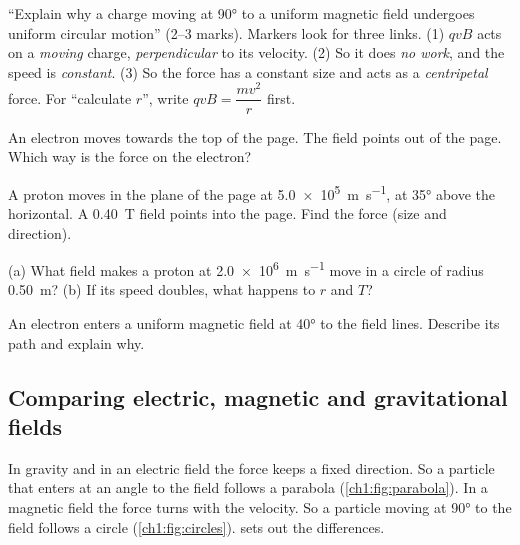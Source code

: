 \begin{examtip}
``Explain why a charge moving at \ang{90} to a uniform magnetic field undergoes
uniform circular motion'' (2--3 marks). Markers look for three links.
(1) $qvB$ acts on a \emph{moving} charge, \emph{perpendicular} to its velocity.
(2) So it does \emph{no work}, and the speed is \emph{constant}. (3) So the
force has a constant size and acts as a \emph{centripetal} force. For
``calculate $r$'', write $qvB = \dfrac{mv^2}{r}$ first.
\end{examtip}

\begin{quickcheck}
  \item An electron moves towards the top of the page. The field points out of
        the page. Which way is the force on the electron?
  \item A proton moves in the plane of the page at \qty{5.0e5}{m.s^{-1}}, at
        \ang{35} above the horizontal. A \qty{0.40}{T} field points into the
        page. Find the force (size and direction).
  \item (a) What field makes a proton at \qty{2.0e6}{m.s^{-1}} move in a circle
        of radius \qty{0.50}{m}? (b) If its speed doubles, what happens to $r$ and $T$?
  \item An electron enters a uniform magnetic field at \ang{40} to the field
        lines. Describe its path and explain why.
\end{quickcheck}

\subsection{Comparing electric, magnetic and gravitational fields}

In gravity and in an electric field the force keeps a fixed direction. So a
particle that enters at an angle to the field follows a parabola
(\cref{ch1:fig:parabola}). In a magnetic field the force turns with the
velocity. So a particle moving at \ang{90} to the field follows a circle
(\cref{ch1:fig:circles}).  sets out the differences.

